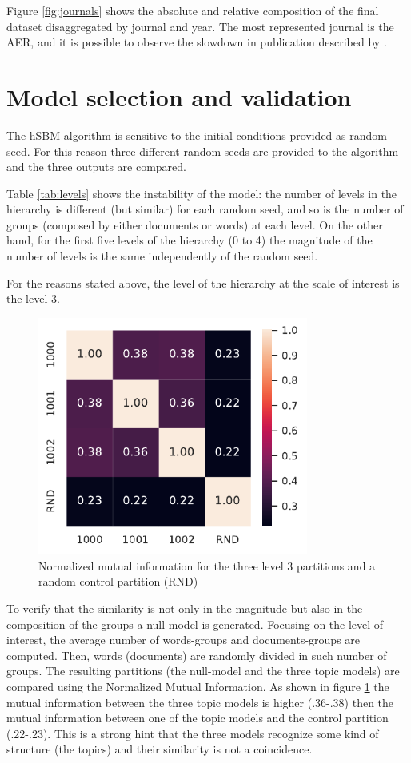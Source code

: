 \documentclass[a4paper, 11pt, headings=standardclasses, tablecaptionsbelow]{scrartcl}
\begin{document}
Figure \ref{fig:journals} shows the absolute and relative composition of the final dataset disaggregated by journal and year.
The most represented journal is the AER, and it is possible to observe the slowdown in publication described by \textcite{ellison2003,card2013}.

\section{Model selection and validation}
The hSBM algorithm is sensitive to the initial conditions provided as random seed. For this reason three different random seeds are provided to the algorithm and the three outputs are compared.



Table \ref{tab:levels} shows the instability of the model: the number of levels in the hierarchy is different (but similar) for each random seed, and so is the number of groups (composed by either documents or words) at each level.
On the other hand, for the first five levels of the hierarchy (0 to 4) the magnitude of the number of levels is the same independently of the random seed.

For the reasons stated above, the level of the hierarchy at the scale of interest is the level 3.

\begin{figure}[tb]
  \centering
  \includegraphics[width=3.5in]{src/mi.pdf}
  \caption[Mutual Information for the level of interest]{Normalized mutual information for the three level 3 partitions and a random control partition (RND)}
  \label{fig:mi}
\end{figure}

To verify that the similarity is not only in the magnitude but also in the composition of the groups a null-model is generated. Focusing on the level of interest, the average number of words-groups and documents-groups are computed. Then, words (documents) are randomly divided in such number of groups. The resulting partitions (the null-model and the three topic models) are compared using the Normalized Mutual Information. As shown in figure \ref{fig:mi} the mutual information between the three topic models is higher (.36-.38) then the mutual information between one of the topic models and the control partition (.22-.23). This is a strong hint that the three models recognize some kind of structure (the topics) and their similarity is not a coincidence.
\end{document}
